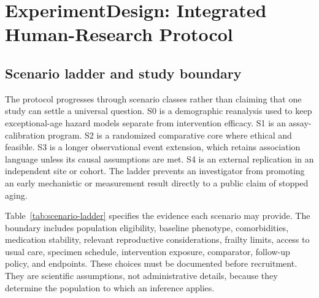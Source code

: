 \documentclass[10pt,conference]{IEEEtran}
\begin{document}
\section{ExperimentDesign: Integrated Human-Research Protocol}
\label{sec:design}

\subsection{Scenario ladder and study boundary}

The protocol progresses through scenario classes rather than claiming that one study can settle a universal question. S0 is a demographic reanalysis used to keep exceptional-age hazard models separate from intervention efficacy. S1 is an assay-calibration program. S2 is a randomized comparative core where ethical and feasible. S3 is a longer observational event extension, which retains association language unless its causal assumptions are met. S4 is an external replication in an independent site or cohort. The ladder prevents an investigator from promoting an early mechanistic or measurement result directly to a public claim of stopped aging.

Table~\ref{tab:scenario-ladder} specifies the evidence each scenario may provide. The boundary includes population eligibility, baseline phenotype, comorbidities, medication stability, relevant reproductive considerations, frailty limits, access to usual care, specimen schedule, intervention exposure, comparator, follow-up policy, and endpoints. These choices must be documented before recruitment. They are scientific assumptions, not administrative details, because they determine the population to which an inference applies.
\end{document}
